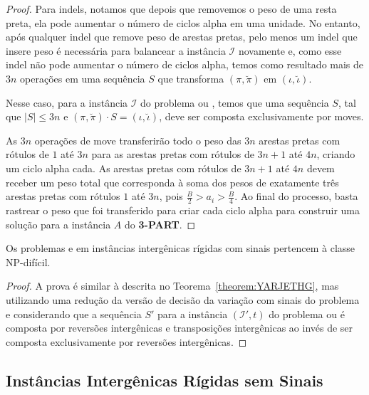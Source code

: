 \begin{proof}
Para indels, notamos que depois que removemos o peso de uma resta preta, ela pode aumentar o número de ciclos alpha em uma unidade. No entanto, após qualquer indel que remove peso de arestas pretas, pelo menos um indel que insere peso é necessária para balancear a instância $\mathcal{I}$ novamente e, como esse indel não pode aumentar o número de ciclos alpha, temos como resultado mais de $3n$ operações em uma sequência $S$ que transforma $(\pi,\breve\pi)$ em $(\iota,\breve\iota)$. 

Nesse caso, para a instância $\mathcal{I}$ do problema \SbIRM{} ou \SbIRMI{}, temos que uma sequência $S$, tal que $|S| \le 3n$ e $(\pi,\breve\pi) \cdot S = (\iota,\breve\iota)$, deve ser composta exclusivamente por moves.

As $3n$ operações de move transferirão todo o peso das $3n$ arestas pretas com rótulos de $1$ até $3n$ para as arestas pretas com rótulos de $3n+1$ até $4n$, criando um ciclo alpha cada. As arestas pretas com rótulos de $3n+1$ até $4n$ devem receber um peso total que corresponda à soma dos pesos de exatamente três arestas pretas com rótulos $1$ até $3n$, pois $\frac{B}{2} > a_i > \frac{B}{4}$. Ao final do processo, basta rastrear o peso que foi transferido para criar cada ciclo alpha para construir uma solução para a instância $A$ do \textbf{3-PART}.
\end{proof}


\begin{theorem}\label{theorem:YACBNPHO}
Os problemas \SbIRTI{} e \SbIRTMI{} em instâncias intergênicas rígidas com sinais pertencem à classe NP-difícil.
\end{theorem}
\begin{proof}
A prova é similar à descrita no Teorema~\ref{theorem:YARJETHG}, mas utilizando uma redução da versão de decisão da variação com sinais do problema \SbRT{} e considerando que a sequência $S'$ para a instância $(\mathcal{I'},t)$ do problema \SbIRTI{} ou \SbIRTMI{} é composta por reversões intergênicas e transposições intergênicas ao invés de ser composta exclusivamente por reversões intergênicas.
\end{proof}

\subsection{Instâncias Intergênicas Rígidas sem Sinais}

